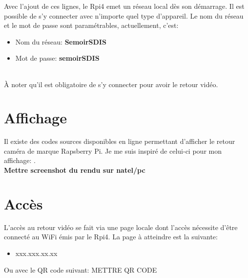 Avec l'ajout de ces lignes, le Rpi4 emet un réseau local dès son démarrage. Il est possible de s'y connecter avec n'importe quel
type d'appareil. Le nom du réseau et le mot de passe sont paramétrables, actuellement, c'est:
\begin{itemize}
    \item Nom du réseau: \textbf{SemoirSDIS}
    \item Mot de passe: \textbf{semoirSDIS}
\end{itemize}\\
À noter qu'il est obligatoire de s'y connecter pour avoir le retour vidéo.
\section{Affichage}
Il existe des codes sources disponibles en ligne permettant d'afficher le retour caméra de marque Rapsberry Pi.
Je me suis inspiré de celui-ci pour mon affichage: \cite{code_camera}.\\
\textbf{Mettre screenshot du rendu sur natel/pc}\\
\section{Accès}
L'accès au retour vidéo se fait via une page locale dont l'accès nécessite d'être connecté au WiFi émis par le Rpi4.
La page à atteindre est la suivante:
\begin{itemize}
    \item  xxx.xxx.xx.xx
\end{itemize}
Ou avec le QR code suivant: METTRE QR CODE
